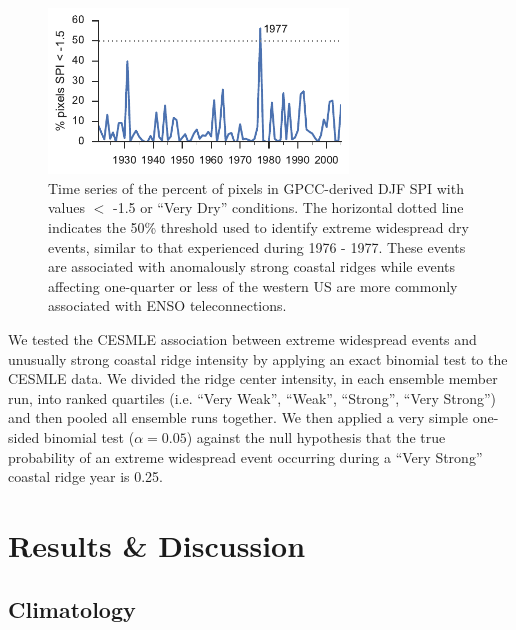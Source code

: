 \documentclass[final, double]{ua-thesis}
\begin{document}
\begin{figure}[ht]
\centering
\centerline{\includegraphics[width=3.13337in]{p3figures/fig_wus_spi_timeseries.pdf}}
\caption{Time series of the percent of pixels in GPCC-derived DJF SPI with values $<$ -1.5 or ``Very Dry'' conditions. The horizontal dotted line indicates the 50\% threshold used to identify extreme widespread dry events, similar to that experienced during 1976 - 1977. These events are associated with anomalously strong coastal ridges while events affecting one-quarter or less of the western US are more commonly associated with ENSO teleconnections.}
\label{fig_wus_spi_timeseries}
\end{figure}

We tested the CESMLE association between extreme widespread events and unusually strong coastal ridge intensity by applying an exact binomial test \citep{3clopper_use_1934, 3conover_practical_1971, 3hollander_nonparametric_1973} to the CESMLE data. We divided the ridge center intensity, in each ensemble member run, into ranked quartiles (i.e. ``Very Weak'', ``Weak'', ``Strong'', ``Very Strong'') and then pooled all ensemble runs together. We then applied a very simple one-sided binomial test ($\alpha = 0.05$) against the null hypothesis that the true probability of an extreme widespread event occurring during a ``Very Strong'' coastal ridge year is 0.25.

\section{Results \& Discussion}

\subsection{Climatology}
\end{document}
